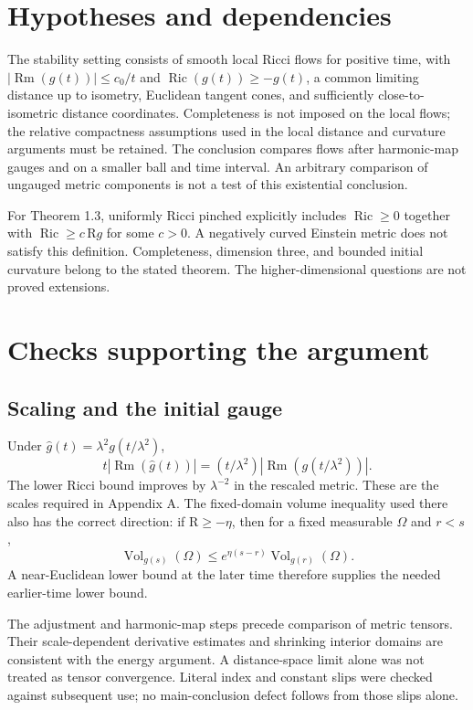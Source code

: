 \documentclass[10pt]{article}
\begin{document}
\section*{Hypotheses and dependencies}
The stability setting consists of smooth local Ricci flows for positive time, with \(|\operatorname{Rm}(g(t))|\leq c_0/t\) and \(\operatorname{Ric}(g(t))\geq-g(t)\), a common limiting distance up to isometry, Euclidean tangent cones, and sufficiently close-to-isometric distance coordinates. Completeness is not imposed on the local flows; the relative compactness assumptions used in the local distance and curvature arguments must be retained. The conclusion compares flows after harmonic-map gauges and on a smaller ball and time interval. An arbitrary comparison of ungauged metric components is not a test of this existential conclusion.\par
For Theorem 1.3, uniformly Ricci pinched explicitly includes \(\operatorname{Ric}\geq0\) together with \(\operatorname{Ric}\geq c\,\mathrm{R}g\) for some \(c>0\). A negatively curved Einstein metric does not satisfy this definition. Completeness, dimension three, and bounded initial curvature belong to the stated theorem. The higher-dimensional questions are not proved extensions.\par
\section*{Checks supporting the argument}
\subsection*{Scaling and the initial gauge}
Under \(\widehat g(t)=\lambda^2g(t/\lambda^2)\), \[t|\operatorname{Rm}(\widehat g(t))|
=(t/\lambda^2)|\operatorname{Rm}(g(t/\lambda^2))|.\] The lower Ricci bound improves by \(\lambda^{-2}\) in the rescaled metric. These are the scales required in Appendix A. The fixed-domain volume inequality used there also has the correct direction: if \(\mathrm{R}\geq-\eta\), then for a fixed measurable \(\Omega\) and \(r<s\), \[\operatorname{Vol}_{g(s)}(\Omega)
 \leq e^{\eta(s-r)}\operatorname{Vol}_{g(r)}(\Omega).\] A near-Euclidean lower bound at the later time therefore supplies the needed earlier-time lower bound.\par
The adjustment and harmonic-map steps precede comparison of metric tensors. Their scale-dependent derivative estimates and shrinking interior domains are consistent with the energy argument. A distance-space limit alone was not treated as tensor convergence. Literal index and constant slips were checked against subsequent use; no main-conclusion defect follows from those slips alone.\par
\end{document}
